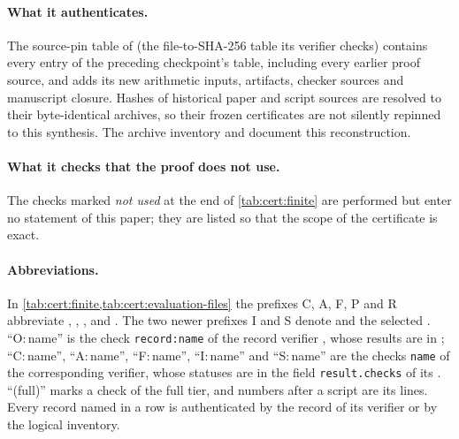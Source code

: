 \paragraph{What it authenticates.}
The source-pin table of  (the
file-to-SHA-256 table its verifier checks) contains every entry
of the preceding checkpoint's table, including every earlier proof
source, and adds its new arithmetic inputs, artifacts, checker
sources and manuscript closure. Hashes of historical paper and script sources are
resolved to their byte-identical archives, so their frozen certificates are
not silently repinned to this synthesis. The archive inventory and
 document this reconstruction.

\paragraph{What it checks that the proof does not use.}
The checks marked \emph{not used} at the end of \cref{tab:cert:finite} are
performed but enter no statement of this paper; they are listed so that the
scope of the certificate is exact.

\paragraph{Abbreviations.}
In \cref{tab:cert:finite,tab:cert:evaluation-files} the prefixes C, A, F, P
and R abbreviate ,
, ,
 and .
The two newer prefixes I and S denote
 and the selected
.
``O:\,name'' is the check \texttt{record:name} of the record verifier
, whose results are in
; ``C:\,name'',
``A:\,name'', ``F:\,name'', ``I:\,name'' and ``S:\,name'' are the checks
\texttt{name} of the corresponding verifier, whose statuses are in the field
\texttt{result.checks} of its .
``(full)'' marks a check of the full tier, and numbers after a script are its
lines. Every record named in a row is authenticated by the record of its
verifier or by the logical inventory.

